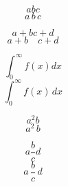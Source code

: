 \documentclass{article}
\begin{document}
$$ a b c$$
$$ a\,b\,c$$

$$ a+b c+d$$
$$ a+b\quad c+d$$

$$ \int_0^\infty f(x) dx$$
$$ \int_0^\infty f(x)\,dx$$

$$ a^2b$$
$$ a^2\,b$$

$$a\frac{b}{c}d$$
$$a\,\frac{b}{c}\,d$$
\end{document}
